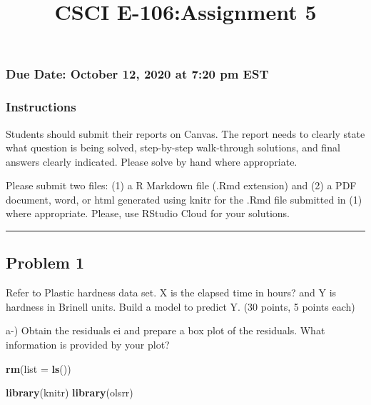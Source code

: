\documentclass[
]{article}
\title{CSCI E-106:Assignment 5}
\author{}
\date{\vspace{-2.5em}}
\newenvironment{Shaded}{\begin{snugshade}}{\end{snugshade}}
\newcommand{\DataTypeTok}[1]{\textcolor[rgb]{0.13,0.29,0.53}{#1}}
\newcommand{\KeywordTok}[1]{\textcolor[rgb]{0.13,0.29,0.53}{\textbf{#1}}}
\newcommand{\NormalTok}[1]{#1}
\begin{document}
\maketitle

\hypertarget{due-date-october-12-2020-at-720-pm-est}{%
\subsubsection{Due Date: October 12, 2020 at 7:20 pm
EST}\label{due-date-october-12-2020-at-720-pm-est}}

\hypertarget{instructions}{%
\subsubsection{Instructions}\label{instructions}}

Students should submit their reports on Canvas. The report needs to
clearly state what question is being solved, step-by-step walk-through
solutions, and final answers clearly indicated. Please solve by hand
where appropriate.

Please submit two files: (1) a R Markdown file (.Rmd extension) and (2)
a PDF document, word, or html generated using knitr for the .Rmd file
submitted in (1) where appropriate. Please, use RStudio Cloud for your
solutions.

\begin{center}\rule{0.5\linewidth}{0.5pt}\end{center}

\hypertarget{problem-1}{%
\subsection{Problem 1}\label{problem-1}}

Refer to Plastic hardness data set. X is the elapsed time in hours? and
Y is hardness in Brinell units. Build a model to predict Y. (30 points,
5 points each)

a-) Obtain the residuals ei and prepare a box plot of the residuals.
What information is provided by your plot?

\begin{Shaded}
\begin{Highlighting}[]
\KeywordTok{rm}\NormalTok{(}\DataTypeTok{list =} \KeywordTok{ls}\NormalTok{())}

\KeywordTok{library}\NormalTok{(knitr)}
\KeywordTok{library}\NormalTok{(olsrr)}
\end{Highlighting}
\end{Shaded}
\end{document}

